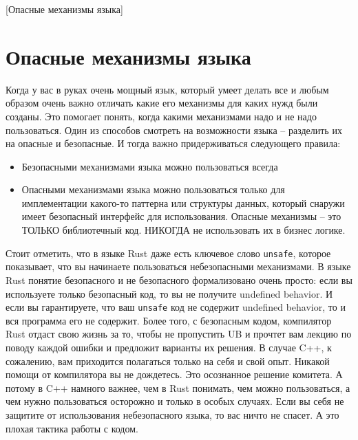 [Опасные механизмы языка]


\section{Опасные механизмы языка}
\label{section::Dangerous}
Когда у вас в руках очень мощный язык, который умеет делать все и любым образом очень важно отличать какие его механизмы для каких нужд были созданы.
Это помогает понять, когда какими механизмами надо и не надо пользоваться.
Один из способов смотреть на возможности языка -- разделить их на опасные и безопасные.
И тогда важно придерживаться следующего правила:
\begin{itemize}
\item Безопасными механизмами языка можно пользоваться всегда

\item Опасными механизмами языка можно пользоваться только для имплементации какого-то паттерна или структуры данных, который снаружи имеет безопасный интерфейс для использования.
Опасные механизмы -- это ТОЛЬКО библиотечный код.
НИКОГДА не использовать их в бизнес логике.
\end{itemize}

Стоит отметить, что в языке Rust даже есть ключевое слово \verb"unsafe", которое показывает, что вы начинаете пользоваться небезопасными механизмами.
В языке Rust понятие безопасного и не безопасного формализовано очень просто: если вы используете только безопасный код, то вы не получите undefined behavior.
И если вы гарантируете, что ваш \verb"unsafe" код не содержит undefined behavior, то и вся программа его не содержит.
Более того, с безопасным кодом, компилятор Rust отдаст свою жизнь за то, чтобы не пропустить UB и прочтет вам лекцию по поводу каждой ошибки и предложит варианты их решения.
В случае C++, к сожалению, вам приходится полагаться только на себя и свой опыт.
Никакой помощи от компилятора вы не дождетесь.
Это осознанное решение комитета.
А потому в C++ намного важнее, чем в Rust понимать, чем можно пользоваться, а чем нужно пользоваться осторожно и только в особых случаях.
Если вы себя не защитите от использования небезопасного языка, то вас ничто не спасет.
А это плохая тактика работы с кодом.

